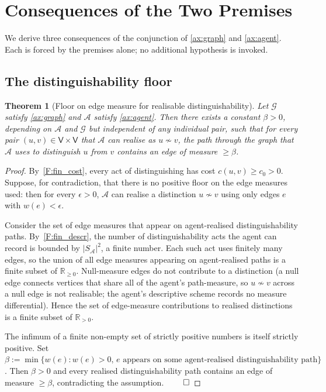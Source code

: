 \documentclass[11pt,a4paper]{article}
\theoremstyle{thmstyle}
\newtheorem{theorem}{Theorem}[section]
\theoremstyle{definition}
\theoremstyle{remark}
\newcommand{\R}{\mathbb{R}}
\newcommand{\Graph}{\mathcal{G}}
\newcommand{\Vrt}{\mathsf{V}}
\newcommand{\Agent}{\mathcal{A}}
\newcommand{\floor}{\beta}
\begin{document}
\section{Consequences of the Two Premises}
\label{sec:consequences}

We derive three consequences of the conjunction of \cref{ax:graph}
and \cref{ax:agent}. Each is forced by the premises alone; no
additional hypothesis is invoked.

\subsection{The distinguishability floor}

\begin{theorem}[Floor on edge measure for realisable
distinguishability]
\label{thm:floor}
Let $\Graph$ satisfy \cref{ax:graph} and $\Agent$ satisfy
\cref{ax:agent}. Then there exists a constant $\floor > 0$,
depending on $\Agent$ and $\Graph$ but independent of any individual
pair, such that for every pair $(u, v) \in \Vrt \times \Vrt$ that
$\Agent$ can realise as $u \not\sim v$, the path through the graph
that $\Agent$ uses to distinguish $u$ from $v$ contains an edge of
measure $\geq \floor$.
\end{theorem}

\begin{proof}
By~\ref{F:fin_cost}, every act of distinguishing has cost
$c(u,v) \geq c_0 > 0$. Suppose, for contradiction, that there is no
positive floor on the edge measures used: then for every
$\epsilon > 0$, $\Agent$ can realise a distinction $u \not\sim v$
using only edges $e$ with $w(e) < \epsilon$.

Consider the set of edge measures that appear on agent-realised
distinguishability paths. By~\ref{F:fin_descr}, the number of
distinguishability acts the agent can record is bounded by
$|S_\Agent|^2$, a finite number. Each such act uses finitely many
edges, so the union of all edge measures appearing on agent-realised
paths is a finite subset of $\R_{\geq 0}$. Null-measure edges do
not contribute to a distinction (a null edge connects vertices
that share all of the agent's path-measure, so $u \not\sim v$
across a null edge is not realisable; the agent's descriptive
scheme records no measure differential). Hence the set of
edge-measure contributions to realised distinctions is a finite
subset of $\R_{> 0}$.

The infimum of a finite non-empty set of strictly positive numbers
is itself strictly positive. Set
$\floor := \min \{w(e) : w(e) > 0,\,e \text{ appears on some
agent-realised distinguishability path}\}$. Then $\floor > 0$ and
every realised distinguishability path contains an edge of measure
$\geq \floor$, contradicting the assumption. $\qed$
\end{proof}
\end{document}
